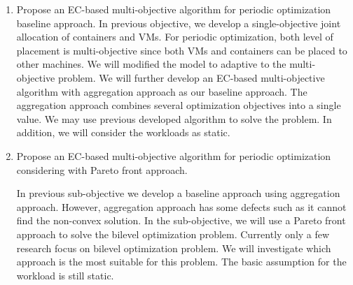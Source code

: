 \begin{enumerate}
	\item Propose an EC-based multi-objective algorithm for periodic optimization baseline approach.
	In previous objective, we develop a single-objective joint allocation of containers and VMs.  For periodic optimization, both level of placement is multi-objective since both VMs and containers can be placed to other machines. We will modified the model to adaptive to the multi-objective problem. We will further develop an EC-based multi-objective algorithm with aggregation approach as our baseline approach. The aggregation approach combines several optimization objectives into a single value. We may use previous developed algorithm to solve the problem. In addition, we will consider the workloads as static. 

	\item Propose an EC-based multi-objective algorithm for periodic optimization considering with Pareto front approach.

	In previous sub-objective we develop a baseline approach using aggregation approach. However, aggregation approach has some defects such as it cannot find the non-convex solution. In the sub-objective, we will use a Pareto front approach to solve the bilevel optimization problem. Currently only a few research \cite{Yin:2000bt, Deb:2009jh,Deb:2010in} focus on bilevel optimization problem. We will investigate which approach is the most suitable for this problem.
	The basic assumption for the workload is still static.



\end{enumerate}
